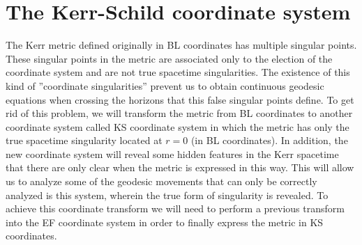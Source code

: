 \chapter{The Kerr-Schild coordinate system}\label{ch:introduction}
The Kerr metric defined originally in \gls{BL} coordinates \cite{boyer2004maximal} has multiple singular points. These singular points in the metric are associated only to the election of the coordinate system and are not true spacetime singularities. The existence of this kind of ''coordinate singularities'' prevent us to obtain continuous geodesic equations  when crossing the horizons that this false singular points define. To get rid of this problem, we will transform the metric from \gls{BL} coordinates to another coordinate system called \gls{KS} coordinate system in which the metric has only the true spacetime singularity located at $r=0$ (in \gls{BL} coordinates). In addition, the new coordinate system will reveal some hidden features in the Kerr spacetime that there are only clear when the metric is expressed in this way. This will allow us to analyze some of the geodesic movements that can only be correctly analyzed is this system, wherein the true form of singularity is revealed. To achieve this coordinate transform we will need to perform a previous transform into the \gls{EF} coordinate system in order to finally express the metric in \gls{KS} coordinates.


